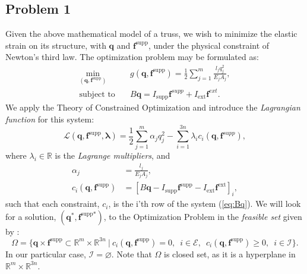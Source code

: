\documentclass[10pt,a4paper]{article}
\begin{document}
\subsection{Problem 1}
Given the above mathematical model of a truss, we wish to minimize the elastic strain on its structure, with $\boldsymbol{q}$ and $\boldsymbol{f}^{\text{supp}}$, under the physical constraint of Newton's third law. The optimization problem may be formulated as:
\begin{align}
\min\limits_{(\boldsymbol{q},\boldsymbol{f}^{\text{supp}})}\quad&g(\boldsymbol{q},\boldsymbol{f}^\text{supp})=\frac{1}{2}\sum_{j=1}^m \frac{l_j q_j^2}{E_j A_j} ,\label{eq:min g}\\
\text{subject to} \quad &B\boldsymbol{q} = I_\text{supp}\boldsymbol{f}^{supp}+I_\text{ext}\boldsymbol{f}^{ext}.\label{eq:Bq}
\end{align}
We apply the Theory of Constrained Optimization and introduce the \textit{Lagrangian function} for this system:
\begin{equation*}
\mathcal{L}\left(\boldsymbol{q},\boldsymbol{f}^{\text{supp}},\boldsymbol{\lambda}\right) = \frac{1}{2}\sum_{j=1}^m \alpha_j q_{j}^2 - \sum_{i=1}^{3n}\lambda_i c_i\left(\boldsymbol{q},\boldsymbol{f}^{supp}\right),
\end{equation*}
where $\lambda_i \in \mathbb{R}$ is the \textit{Lagrange multipliers}, and 
\begin{align*}
\alpha_j &= \frac{l_j}{E_j A_j}, \\
c_i\left(\boldsymbol{q},\boldsymbol{f}^\text{supp}\right) &= \left[ B\boldsymbol{q} - I_\text{supp}\boldsymbol{f}^\text{supp}-I_\text{ext}\boldsymbol{f}^\text{ext} \right]_i ,
\end{align*}
such that each constraint, $c_i$, is the i'th row of the system (\ref{eq:Bq}). We will look for a solution, $\left(\boldsymbol{q}^*,\boldsymbol{f}^\text{supp*}\right)$, to the Optimization Problem in the \textit{feasible set} given by :
\begin{equation*}
\Omega = \lbrace \boldsymbol{q} \times \boldsymbol{f}^\text{supp} \subset \mathbb{R}^m \times \mathbb{R}^{3n} \ | \ c_i\left(\boldsymbol{q},\boldsymbol{f}^\text{supp}\right) = 0, \enspace i \in \mathcal{E},\enspace c_i\left(\boldsymbol{q},\boldsymbol{f}^\text{supp}\right) \geq 0, \enspace i \in \mathcal{I} \rbrace.
\end{equation*}
In our particular case, $\mathcal{I}=\varnothing$. Note that $\Omega$ is closed set, as it is a hyperplane in $\mathbb{R}^m \times \mathbb{R}^{3n}$.
\end{document}
